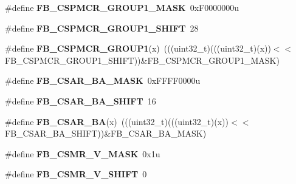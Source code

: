 \begin{DoxyCompactItemize}
\item 
\#define {\bfseries F\+B\+\_\+\+C\+S\+P\+M\+C\+R\+\_\+\+G\+R\+O\+U\+P1\+\_\+\+M\+A\+SK}~0x\+F0000000u\hypertarget{group__FB__Register__Masks_ga735fd2a0040e9ad1122a3c3fc8e28193}{}\label{group__FB__Register__Masks_ga735fd2a0040e9ad1122a3c3fc8e28193}

\item 
\#define {\bfseries F\+B\+\_\+\+C\+S\+P\+M\+C\+R\+\_\+\+G\+R\+O\+U\+P1\+\_\+\+S\+H\+I\+FT}~28\hypertarget{group__FB__Register__Masks_ga9c83850dcb3efe92a0404101e5afbdca}{}\label{group__FB__Register__Masks_ga9c83850dcb3efe92a0404101e5afbdca}

\item 
\#define {\bfseries F\+B\+\_\+\+C\+S\+P\+M\+C\+R\+\_\+\+G\+R\+O\+U\+P1}(x)~(((uint32\+\_\+t)(((uint32\+\_\+t)(x))$<$$<$F\+B\+\_\+\+C\+S\+P\+M\+C\+R\+\_\+\+G\+R\+O\+U\+P1\+\_\+\+S\+H\+I\+FT))\&F\+B\+\_\+\+C\+S\+P\+M\+C\+R\+\_\+\+G\+R\+O\+U\+P1\+\_\+\+M\+A\+SK)\hypertarget{group__FB__Register__Masks_gad8cfbe8c479a928d91e215283db376af}{}\label{group__FB__Register__Masks_gad8cfbe8c479a928d91e215283db376af}

\item 
\#define {\bfseries F\+B\+\_\+\+C\+S\+A\+R\+\_\+\+B\+A\+\_\+\+M\+A\+SK}~0x\+F\+F\+F\+F0000u\hypertarget{group__FB__Register__Masks_ga917335c957f6472faf91ae0b244db487}{}\label{group__FB__Register__Masks_ga917335c957f6472faf91ae0b244db487}

\item 
\#define {\bfseries F\+B\+\_\+\+C\+S\+A\+R\+\_\+\+B\+A\+\_\+\+S\+H\+I\+FT}~16\hypertarget{group__FB__Register__Masks_ga098f6109a1dcc8cc007bca53c312810f}{}\label{group__FB__Register__Masks_ga098f6109a1dcc8cc007bca53c312810f}

\item 
\#define {\bfseries F\+B\+\_\+\+C\+S\+A\+R\+\_\+\+BA}(x)~(((uint32\+\_\+t)(((uint32\+\_\+t)(x))$<$$<$F\+B\+\_\+\+C\+S\+A\+R\+\_\+\+B\+A\+\_\+\+S\+H\+I\+FT))\&F\+B\+\_\+\+C\+S\+A\+R\+\_\+\+B\+A\+\_\+\+M\+A\+SK)\hypertarget{group__FB__Register__Masks_ga711f226d59ad769fe5112524c7dc7b66}{}\label{group__FB__Register__Masks_ga711f226d59ad769fe5112524c7dc7b66}

\item 
\#define {\bfseries F\+B\+\_\+\+C\+S\+M\+R\+\_\+\+V\+\_\+\+M\+A\+SK}~0x1u\hypertarget{group__FB__Register__Masks_ga746554e800a78e64f18c333f8b3dbd2c}{}\label{group__FB__Register__Masks_ga746554e800a78e64f18c333f8b3dbd2c}

\item 
\#define {\bfseries F\+B\+\_\+\+C\+S\+M\+R\+\_\+\+V\+\_\+\+S\+H\+I\+FT}~0\hypertarget{group__FB__Register__Masks_ga62bde86e3e74e677b6cb555c806d1dc3}{}\label{group__FB__Register__Masks_ga62bde86e3e74e677b6cb555c806d1dc3}


\end{DoxyCompactItemize}
